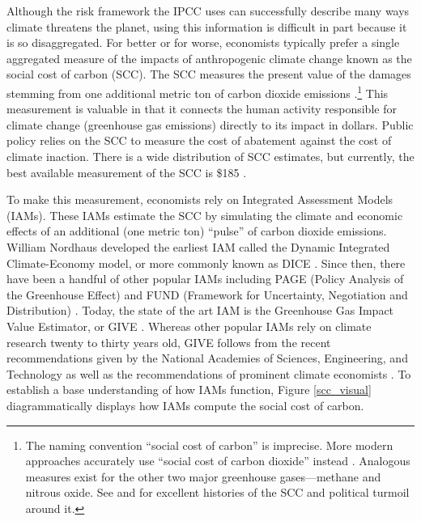 Although the risk framework the IPCC uses can successfully describe many ways climate threatens the planet, using this information is difficult in part because it is so disaggregated. For better or for worse, economists typically prefer a single aggregated measure of the impacts of anthropogenic climate change known as the social cost of carbon (SCC). The SCC measures the present value of the damages stemming from one additional metric ton of carbon dioxide emissions \citep{scc_explainer}.\footnote{The naming convention ``social cost of carbon'' is imprecise. More modern approaches accurately use ``social cost of carbon dioxide'' instead \cite{rennert2022comprehensive}. Analogous measures exist for the other two major greenhouse gases---methane and nitrous oxide. See \cite{scc_explainer} and \cite{auffhammer2018quantifying} for excellent histories of the SCC and political turmoil around it.} This measurement is valuable in that it connects the human activity responsible for climate change (greenhouse gas emissions) directly to its impact in dollars. Public policy relies on the SCC to measure the cost of abatement against the cost of climate inaction. There is a wide distribution of SCC estimates, but currently, the best available measurement of the SCC is \$185 \citep{rennert2022comprehensive}. 

To make this measurement, economists rely on Integrated Assessment Models (IAMs). These IAMs estimate the SCC by simulating the climate and economic effects of an additional (one metric ton) ``pulse'' of carbon dioxide emissions. William Nordhaus developed the earliest IAM called the Dynamic Integrated Climate-Economy model, or more commonly known as DICE \citep{nordhaus1992optimal, nordhaus1993optimal}. Since then, there have been a handful of other popular IAMs including PAGE (Policy Analysis of the Greenhouse Effect) and FUND (Framework for Uncertainty, Negotiation and Distribution) \citep{hope2006marginal, tol1997optimal}. Today, the state of the art IAM is the Greenhouse Gas Impact Value Estimator, or GIVE \citep{rennert2022comprehensive}. Whereas other popular IAMs rely on climate research twenty to thirty years old, GIVE follows from the recent recommendations given by the National Academies of Sciences, Engineering, and Technology as well as the recommendations of prominent climate economists \citep{national2017valuing, carleton2022guide}. To establish a base understanding of how IAMs function, Figure \ref{scc_visual} diagrammatically displays how IAMs compute the social cost of carbon. 

